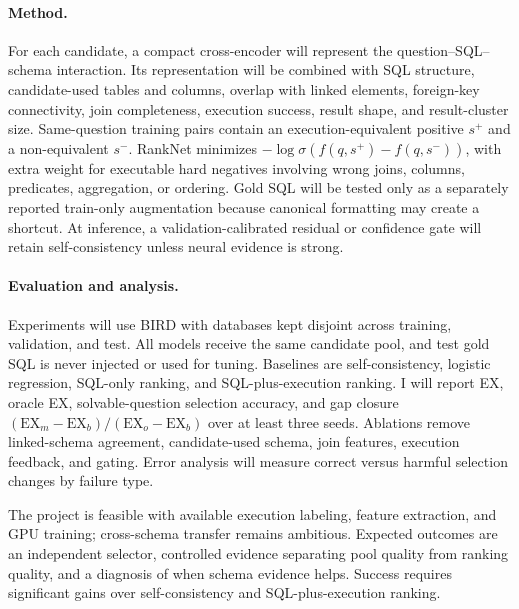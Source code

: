 \documentclass{article}
\begin{document}
\paragraph{Method.}
For each candidate, a compact cross-encoder will represent the question--SQL--schema interaction. Its representation will be combined with SQL structure, candidate-used tables and columns, overlap with linked elements, foreign-key connectivity, join completeness, execution success, result shape, and result-cluster size. Same-question training pairs contain an execution-equivalent positive $s^+$ and a non-equivalent $s^-$. RankNet minimizes $-\log\sigma(f(q,s^+)-f(q,s^-))$, with extra weight for executable hard negatives involving wrong joins, columns, predicates, aggregation, or ordering. Gold SQL will be tested only as a separately reported train-only augmentation because canonical formatting may create a shortcut. At inference, a validation-calibrated residual or confidence gate will retain self-consistency unless neural evidence is strong.

\paragraph{Evaluation and analysis.}
Experiments will use BIRD with databases kept disjoint across training, validation, and test. All models receive the same candidate pool, and test gold SQL is never injected or used for tuning. Baselines are self-consistency, logistic regression, SQL-only ranking, and SQL-plus-execution ranking. I will report EX, oracle EX, solvable-question selection accuracy, and gap closure $(\mathrm{EX}_{m}-\mathrm{EX}_{b})/(\mathrm{EX}_{o}-\mathrm{EX}_{b})$ over at least three seeds. Ablations remove linked-schema agreement, candidate-used schema, join features, execution feedback, and gating. Error analysis will measure correct versus harmful selection changes by failure type.

The project is feasible with available execution labeling, feature extraction, and GPU training; cross-schema transfer remains ambitious. Expected outcomes are an independent selector, controlled evidence separating pool quality from ranking quality, and a diagnosis of when schema evidence helps. Success requires significant gains over self-consistency and SQL-plus-execution ranking.
\end{document}
